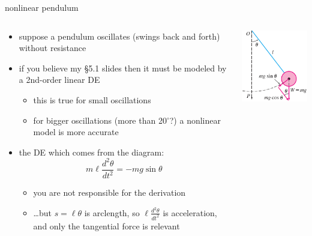 \documentclass[urlcolor=blue,dvipsnames]{beamer}
\begin{document}
\begin{frame}{nonlinear pendulum}

\begin{columns}
\begin{column}{0.7\textwidth}
\begin{itemize}
\item suppose a pendulum oscillates (swings back and forth) without resistance
\item if you believe my \S5.1 slides then it must be modeled by a 2nd-order linear DE
     \begin{itemize}
     \item this is true for small oscillations 
     \item for bigger oscillations (more than 20$^\circ$?) a nonlinear model is more accurate
     \end{itemize}
\item the DE which comes from the diagram:
    $$m \ell \frac{d^2\theta}{dt^2} = - mg \sin\theta$$

\vspace{-2mm}
     \begin{itemize}
     \item you are not responsible for the derivation
     \item \dots but $s=\ell \theta$ is arclength, so $\ell \frac{d^2\theta}{dt^2}$ is acceleration, and only the tangential force is relevant
     \end{itemize}
\end{itemize}
\end{column}
\begin{column}{0.3\textwidth}
\includegraphics[width=\textwidth]{figs/pendulum}
\end{column}
\end{columns}
\end{frame}
\end{document}
